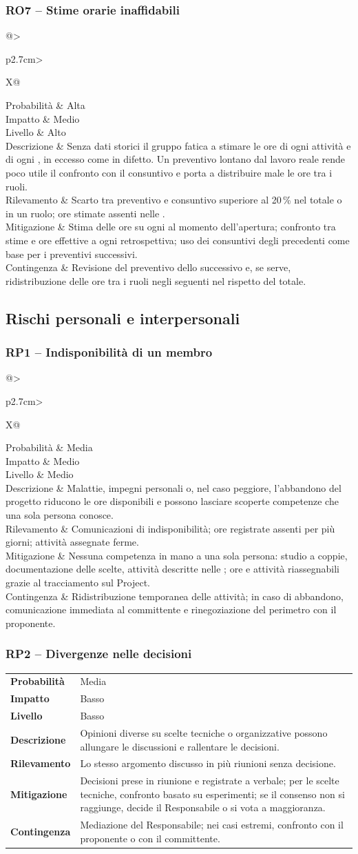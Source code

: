 \documentclass[documento]{gpt}
\makeatletter
\newcommand{\rischio}[9]{%
  \subsubsection{#1 -- #2}\label{rischio:#1}
  \noindent
  \begin{tabularx}{\linewidth}{@{}>{\raggedright\arraybackslash\bfseries}p{2.7cm}>{\raggedright\arraybackslash}X@{}}
    \toprule
    Probabilità & #3 \\
    Impatto     & #4 \\
    Livello     & #5 \\
    \midrule
    Descrizione & #6 \\
    \addlinespace
    Rilevamento & #7 \\
    \addlinespace
    Mitigazione & #8 \\
    \addlinespace
    Contingenza & #9 \\
    \bottomrule
  \end{tabularx}
  \medskip
}
\makeatother
\begin{document}
\rischio{RO7}{Stime orarie inaffidabili}{Alta}{Medio}{Alto}
{Senza dati storici il gruppo fatica a stimare le ore di ogni attività e
 di ogni \glo[Sprint]{\textit{sprint}}, in eccesso come in difetto. Un
 preventivo lontano dal lavoro reale rende poco utile il confronto con il
 consuntivo e porta a distribuire male le ore tra i ruoli.}
{Scarto tra preventivo e consuntivo superiore al 20\,\% nel totale o in
 un ruolo; ore stimate assenti nelle \glo[Issue]{\textit{issue}}.}
{Stima delle ore su ogni \glo[Issue]{\textit{issue}} al momento
 dell'apertura; confronto tra stime e ore effettive a ogni retrospettiva;
 uso dei consuntivi degli \glo[Sprint]{\textit{sprint}} precedenti come base
 per i preventivi successivi.}
{Revisione del preventivo dello \glo[Sprint]{\textit{sprint}} successivo e,
 se serve, ridistribuzione delle ore tra i ruoli negli
 \glo[Sprint]{\textit{sprint}} seguenti nel rispetto del totale.}

\subsection{Rischi personali e interpersonali}

\rischio{RP1}{Indisponibilità di un membro}{Media}{Medio}{Medio}
{Malattie, impegni personali o, nel caso peggiore, l'abbandono del
 progetto riducono le ore disponibili e possono lasciare scoperte
 competenze che una sola persona conosce.}
{Comunicazioni di indisponibilità; ore registrate assenti per più giorni;
 attività assegnate ferme.}
{Nessuna competenza in mano a una sola persona: studio a coppie,
 documentazione delle scelte, attività descritte nelle \glo[Issue]{\textit{issue}}; ore e
 attività riassegnabili grazie al tracciamento sul Project.}
{Ridistribuzione temporanea delle attività; in caso di abbandono,
 comunicazione immediata al committente e rinegoziazione del perimetro con
 il proponente.}

\rischio{RP2}{Divergenze nelle decisioni}{Media}{Basso}{Basso}
{Opinioni diverse su scelte tecniche o organizzative possono allungare le
 discussioni e rallentare le decisioni.}
{Lo stesso argomento discusso in più riunioni senza decisione.}
{Decisioni prese in riunione e registrate a verbale; per le scelte
 tecniche, confronto basato su esperimenti; se il consenso non si
 raggiunge, decide il Responsabile o si vota a maggioranza.}
{Mediazione del Responsabile; nei casi estremi, confronto con il
 proponente o con il committente.}
\end{document}
